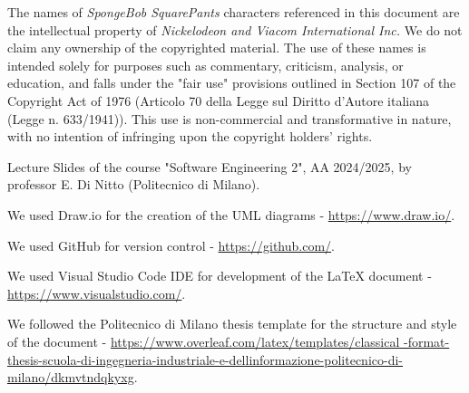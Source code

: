 \renewcommand{\thesection}{\Alph{section}}
The names of \textit{SpongeBob SquarePants} characters referenced in this document are the intellectual property of \textit{Nickelodeon and Viacom International Inc.}
We do not claim any ownership of the copyrighted material. The use of these names is intended solely for purposes such as commentary, criticism, analysis, 
or education, and falls under the "fair use" provisions outlined in Section 107 of the Copyright Act of 1976 (Articolo 70 della Legge sul Diritto d'Autore 
italiana (Legge n. 633/1941)). This use is non-commercial and transformative in nature, with no intention of infringing upon the copyright holders' rights.

Lecture Slides of the course "Software Engineering 2", AA 2024/2025, by professor E. Di Nitto (Politecnico di Milano).

We used Draw.io for the creation of the UML diagrams - \url{https://www.draw.io/}.

We used GitHub for version control - \url{https://github.com/}.

We used Visual Studio Code IDE for development of the LaTeX document - \url{https://www.visualstudio.com/}.

We followed the Politecnico di Milano thesis template for the structure and style of the document -
\url{https://www.overleaf.com/latex/templates/classical
-format-thesis-scuola-di-ingegneria-industriale-e-dellinformazione-politecnico-di-milano/dkmvtndqkyxg}.
